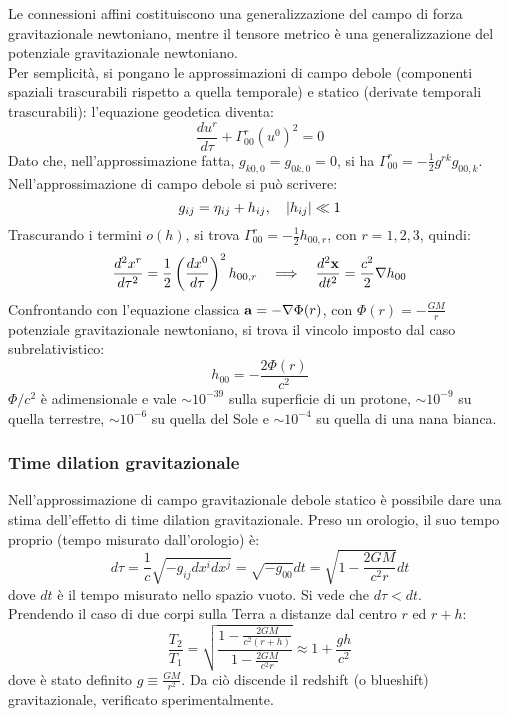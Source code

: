 Le connessioni affini costituiscono una generalizzazione del campo di forza gravitazionale newtoniano, mentre il tensore metrico è una generalizzazione del potenziale gravitazionale newtoniano.\\
Per semplicità, si pongano le approssimazioni di campo debole (componenti spaziali trascurabili rispetto a quella temporale) e statico (derivate temporali trascurabili): l'equazione geodetica diventa:
\begin{equation}
	\frac{du^r}{d\tau} + \Gamma^r_{00} \left( u^0 \right)^2 = 0
	\label{eq:5.25}
\end{equation}
Dato che, nell'approssimazione fatta, $ g_{k0,0} = g_{0k,0} = 0 $, si ha $ \Gamma^r_{00} = -\frac{1}{2} g^{rk}g_{00,k} $. Nell'approssimazione di campo debole si può scrivere:
\begin{equation}
	g_{ij} = \eta_{ij} + h_{ij}, \quad \left\lvert h_{ij}\right\rvert \ll 1
	\label{eq:5.26}
\end{equation}
Trascurando i termini $ o(h) $, si trova $ \Gamma^r_{00} = -\frac{1}{2} h_{00,r} $, con $ r = 1,2,3 $, quindi:
\begin{equation}
	\frac{d^2 x^r}{d\tau^2} = \frac{1}{2} \left( \frac{dx^0}{d\tau} \right)^2 h_{00,r} \quad\Longrightarrow\quad \frac{d^2 \mathbf{x}}{dt^2} = \frac{c^2}{2} \nabla h_{00}
	\label{eq:5.27}
\end{equation}
Confrontando con l'equazione classica $ \mathbf{a} = - \nabla \Phi(r) $, con $ \Phi(r) = - \frac{GM}{r} $ potenziale gravitazionale newtoniano, si trova il vincolo imposto dal caso subrelativistico:
\begin{equation}
	h_{00} = - \frac{2\Phi(r)}{c^2}
	\label{eq:5.28}
\end{equation}
$ \Phi / c^2 $ è adimensionale e vale $ \sim 10^{-39} $ sulla superficie di un protone, $ \sim 10^{-9} $ su quella terrestre, $ \sim 10^{-6} $ su quella del Sole e $ \sim 10^{-4} $ su quella di una nana bianca.

\subsubsection{Time dilation gravitazionale}

Nell'approssimazione di campo gravitazionale debole statico è possibile dare una stima dell'effetto di time dilation gravitazionale. Preso un orologio, il suo tempo proprio (tempo misurato dall'orologio) è:
\begin{equation}
	d\tau = \frac{1}{c} \sqrt{-g_{ij} dx^i dx^j} = \sqrt{-g_{00}} dt = \sqrt{ 1 - \frac{2GM}{c^2 r}} dt
	\label{eq:5.29}
\end{equation}
dove $ dt $ è il tempo misurato nello spazio vuoto. Si vede che $ d\tau < dt $.\\
Prendendo il caso di due corpi sulla Terra a distanze dal centro $ r $ ed $ r + h $:
\begin{equation}
	\frac{T_2}{T_1} = \sqrt{\frac{1 - \frac{2GM}{c^2(r+h)}}{1 - \frac{2GM}{c^2r}}} \approx 1 + \frac{gh}{c^2}
	\label{eq:5.30}
\end{equation}
dove è stato definito $ g \equiv \frac{GM}{r^2} $. Da ciò discende il redshift (o blueshift) gravitazionale, verificato sperimentalmente.

